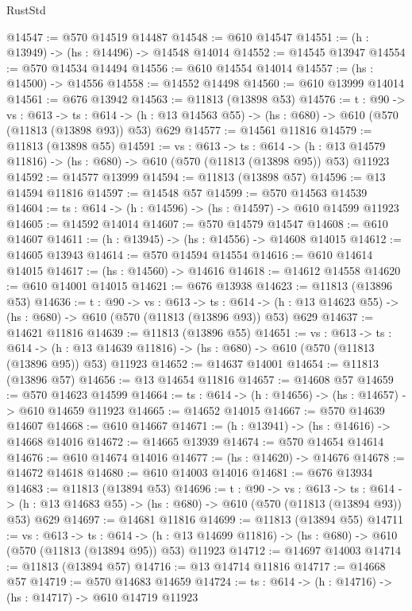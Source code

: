 \begin{lexlean}{RustStd}
\begin{coremodule}
@14547 := @570 @14519 @14487
@14548 := @610 @14547
@14551 := (h : @13949) -> (hs : @14496) -> @14548 @14014
@14552 := @14545 @13947
@14554 := @570 @14534 @14494
@14556 := @610 @14554 @14014
@14557 := (hs : @14500) -> @14556
@14558 := @14552 @14498
@14560 := @610 @13999 @14014
@14561 := @676 @13942
@14563 := @11813 (@13898 @53)
@14576 := {t : @90} ->
  {vs : @613} ->
  {ts : @614} -> (h : @13 @14563 @55) -> (hs : @680) -> @610 (@570 (@11813 (@13898 @93)) @53) @629
@14577 := @14561 @11816
@14579 := @11813 (@13898 @55)
@14591 := {vs : @613} ->
  {ts : @614} ->
  (h : @13 @14579 @11816) -> (hs : @680) -> @610 (@570 (@11813 (@13898 @95)) @53) @11923
@14592 := @14577 @13999
@14594 := @11813 (@13898 @57)
@14596 := @13 @14594 @11816
@14597 := @14548 @57
@14599 := @570 @14563 @14539
@14604 := {ts : @614} -> (h : @14596) -> (hs : @14597) -> @610 @14599 @11923
@14605 := @14592 @14014
@14607 := @570 @14579 @14547
@14608 := @610 @14607
@14611 := (h : @13945) -> (hs : @14556) -> @14608 @14015
@14612 := @14605 @13943
@14614 := @570 @14594 @14554
@14616 := @610 @14614 @14015
@14617 := (hs : @14560) -> @14616
@14618 := @14612 @14558
@14620 := @610 @14001 @14015
@14621 := @676 @13938
@14623 := @11813 (@13896 @53)
@14636 := {t : @90} ->
  {vs : @613} ->
  {ts : @614} -> (h : @13 @14623 @55) -> (hs : @680) -> @610 (@570 (@11813 (@13896 @93)) @53) @629
@14637 := @14621 @11816
@14639 := @11813 (@13896 @55)
@14651 := {vs : @613} ->
  {ts : @614} ->
  (h : @13 @14639 @11816) -> (hs : @680) -> @610 (@570 (@11813 (@13896 @95)) @53) @11923
@14652 := @14637 @14001
@14654 := @11813 (@13896 @57)
@14656 := @13 @14654 @11816
@14657 := @14608 @57
@14659 := @570 @14623 @14599
@14664 := {ts : @614} -> (h : @14656) -> (hs : @14657) -> @610 @14659 @11923
@14665 := @14652 @14015
@14667 := @570 @14639 @14607
@14668 := @610 @14667
@14671 := (h : @13941) -> (hs : @14616) -> @14668 @14016
@14672 := @14665 @13939
@14674 := @570 @14654 @14614
@14676 := @610 @14674 @14016
@14677 := (hs : @14620) -> @14676
@14678 := @14672 @14618
@14680 := @610 @14003 @14016
@14681 := @676 @13934
@14683 := @11813 (@13894 @53)
@14696 := {t : @90} ->
  {vs : @613} ->
  {ts : @614} -> (h : @13 @14683 @55) -> (hs : @680) -> @610 (@570 (@11813 (@13894 @93)) @53) @629
@14697 := @14681 @11816
@14699 := @11813 (@13894 @55)
@14711 := {vs : @613} ->
  {ts : @614} ->
  (h : @13 @14699 @11816) -> (hs : @680) -> @610 (@570 (@11813 (@13894 @95)) @53) @11923
@14712 := @14697 @14003
@14714 := @11813 (@13894 @57)
@14716 := @13 @14714 @11816
@14717 := @14668 @57
@14719 := @570 @14683 @14659
@14724 := {ts : @614} -> (h : @14716) -> (hs : @14717) -> @610 @14719 @11923

\end{coremodule}
\end{lexlean}
